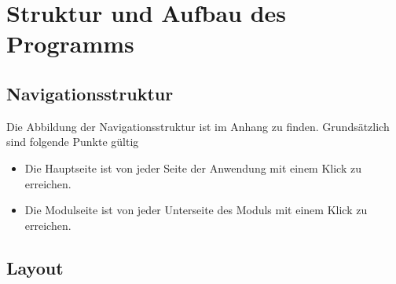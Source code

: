 \chapter{Struktur und Aufbau des Programms}

%
%
%
\section{Navigationsstruktur}
\label{sec:navigation}
Die Abbildung der Navigationsstruktur ist im Anhang zu finden.
Grundsätzlich sind folgende Punkte gültig
\begin{itemize}
  \item Die Hauptseite ist von jeder Seite der Anwendung mit einem Klick zu erreichen.
  \item Die Modulseite ist von jeder Unterseite des Moduls mit einem Klick zu erreichen.
\end{itemize}

%
%
%
\section{Layout}
\label{sec:layout}

